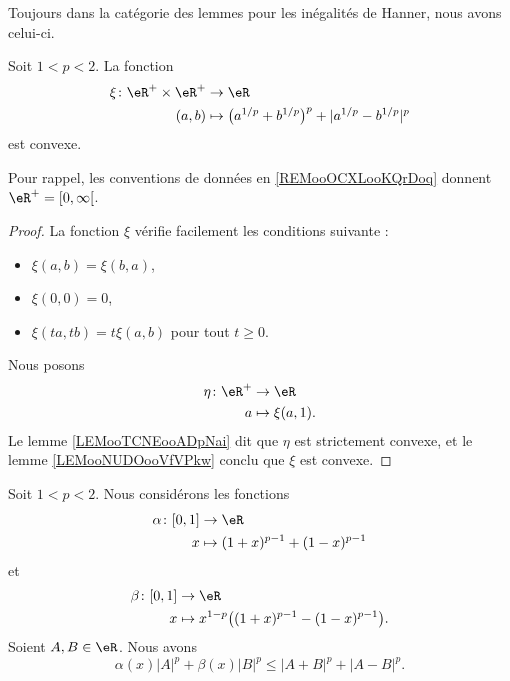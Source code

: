 Toujours dans la catégorie des lemmes pour les inégalités de Hanner, nous avons celui-ci.
\begin{lemma}
    Soit \( 1<p<2\). La fonction
    \begin{equation}
        \begin{aligned}
            \xi\colon \eR^+\times \eR^+&\to \eR \\
            (a,b)&\mapsto \big( a^{1/p}+b^{1/p} \big)^p+| a^{1/p}-b^{1/p} |^p
        \end{aligned}
    \end{equation}
    est convexe.
    
    Pour rappel, les conventions de données en \ref{REMooOCXLooKQrDoq} donnent \( \eR^+=\mathopen[ 0 , \infty \mathclose[\).
\end{lemma}

\begin{proof}
    La fonction \( \xi\) vérifie facilement les conditions suivante :
    \begin{itemize}
        \item \( \xi(a,b)=\xi(b,a)\),
        \item \( \xi(0,0)=0\),
        \item \( \xi(ta,tb)=t\xi(a,b)\) pour tout \( t\geq 0\).
    \end{itemize}
    Nous posons
    \begin{equation}
        \begin{aligned}
            \eta\colon \eR^+&\to \eR \\
            a&\mapsto \xi(a,1).
        \end{aligned}
    \end{equation}
    Le lemme \ref{LEMooTCNEooADpNai} dit que \( \eta\) est strictement convexe, et le lemme \ref{LEMooNUDOooVfVPkw} conclu que \( \xi\) est convexe.
\end{proof}

\begin{lemma}     \label{LEMooWIPYooMZqjbn}
    Soit \( 1<p<2\). Nous considérons les fonctions
    \begin{equation}
        \begin{aligned}
            \alpha\colon \mathopen[ 0 , 1 \mathclose]&\to \eR \\
            x&\mapsto (1+x)^{p-1}+(1-x)^{p-1} 
        \end{aligned}
    \end{equation}
    et
    \begin{equation}
        \begin{aligned}
            \beta\colon \mathopen[ 0 , 1 \mathclose]&\to \eR \\
            x&\mapsto x^{1-p}\big( (1+x)^{p-1}-(1-x)^{p-1} \big).
        \end{aligned}
    \end{equation}
    Soient \( A,B\in \eR\). Nous avons
    \begin{equation}
        \alpha(x)| A |^p+\beta(x)| B |^p\leq | A+B |^p+| A-B |^p.
    \end{equation}
\end{lemma}

